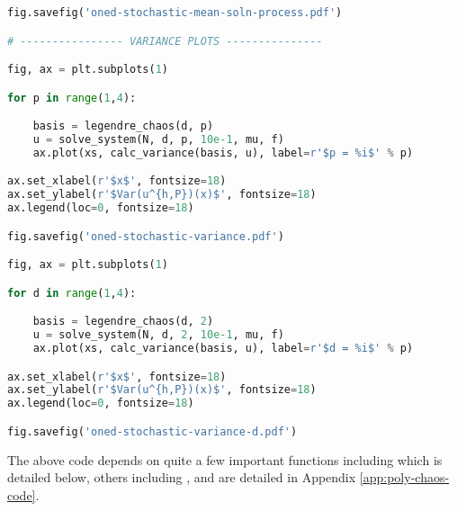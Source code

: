 \begin{lstlisting}[language=Python,
                   caption={Setup code used to obtain results for Chapter
                   \ref{chap:oned-stochastic}},
                   label={code:oned-stochastic-setup}]
fig.savefig('oned-stochastic-mean-soln-process.pdf')

# ---------------- VARIANCE PLOTS ---------------

fig, ax = plt.subplots(1)

for p in range(1,4):

    basis = legendre_chaos(d, p)
    u = solve_system(N, d, p, 10e-1, mu, f)
    ax.plot(xs, calc_variance(basis, u), label=r'$p = %i$' % p)

ax.set_xlabel(r'$x$', fontsize=18)
ax.set_ylabel(r'$Var(u^{h,P})(x)$', fontsize=18)
ax.legend(loc=0, fontsize=18)

fig.savefig('oned-stochastic-variance.pdf')

fig, ax = plt.subplots(1)

for d in range(1,4):

    basis = legendre_chaos(d, 2)
    u = solve_system(N, d, 2, 10e-1, mu, f)
    ax.plot(xs, calc_variance(basis, u), label=r'$d = %i$' % p)

ax.set_xlabel(r'$x$', fontsize=18)
ax.set_ylabel(r'$Var(u^{h,P})(x)$', fontsize=18)
ax.legend(loc=0, fontsize=18)

fig.savefig('oned-stochastic-variance-d.pdf')
\end{lstlisting}

The above code depends on quite a few important functions including
 which is detailed below, others including
,  and  are
detailed in Appendix \ref{app:poly-chaos-code}.


